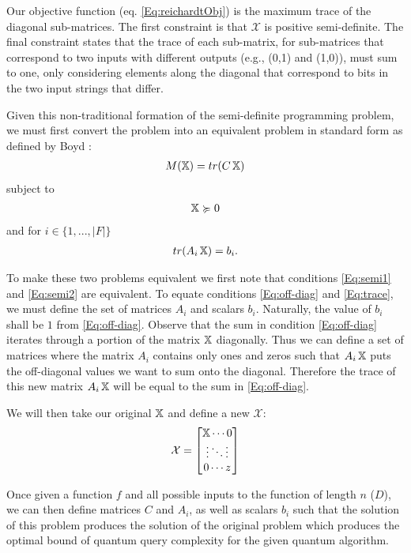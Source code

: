Our objective function (eq. \cref{Eq:reichardtObj}) is
the maximum trace of the diagonal sub-matrices. The
first constraint is that $\mathcal{X}$ is positive
semi-definite. The final constraint states that the
trace of each sub-matrix, for sub-matrices that
correspond to two inputs with different outputs (e.g.,
(0,1) and (1,0)), must sum to one, only considering
elements along the diagonal that correspond to bits in
the two input strings that differ. 

Given this non-traditional formation of the semi-definite programming problem, we must first convert the problem into an equivalent problem in standard form as defined by Boyd \cite{boyd2004convex}:
\begin{align}
    M(\operatorname{\mathbb{X}}) = tr(C\operatorname{\mathbb{X}}) 
\end{align}
subject to
\begin{align}\label{Eq:semi2}
    \operatorname{\mathbb{X}} \succcurlyeq 0   
\end{align}
and for $i \in \{1,...,|F|\}$
\begin{align}\label{Eq:trace}
    tr(A_i \operatorname{\mathbb{X}}) = b_i. 
\end{align}


To make these two problems equivalent we first note that
conditions \cref{Eq:semi1} and \cref{Eq:semi2} are
equivalent.
To equate conditions \cref{Eq:off-diag}
and \cref{Eq:trace}, we must define the set of matrices
$A_i$ and
scalars $b_i$. Naturally, the value of $b_i$ shall be $1$
from \cref{Eq:off-diag}.
Observe that the sum in condition \cref{Eq:off-diag}
iterates through a portion of the matrix $\operatorname{\mathbb{X}}$ diagonally.
Thus we can define a set of matrices where the matrix 
$A_i$ contains only ones and zeros
such that $A_i \operatorname{\mathbb{X}}$ puts the off-diagonal values we want
to sum onto the diagonal.
Therefore the trace of this new matrix $A_i \operatorname{\mathbb{X}}$ 
will be equal to the sum in \cref{Eq:off-diag}.

We will then take our original $\operatorname{\mathbb{X}}$ and define a new
$\mathcal{X}$:
\begin{equation}
    \mathcal{X} = \left[\begin{matrix}\operatorname{\mathbb{X}} \cdots 0 \\
                                \vdots \ddots \vdots \\
                                0 \cdots z  \end{matrix}
                                \right]  
\end{equation}

\qquad Once given a function $f$ and all possible inputs to the
function of length $n$ ($D$), we can then define matrices $C$ and
$A_i$, as well as scalars $b_i$ such that the solution of this problem
produces the solution of the original problem which produces the
optimal bound of quantum query complexity for the given quantum
algorithm.
